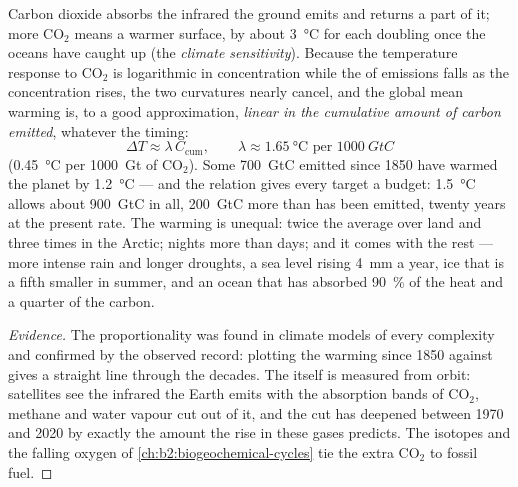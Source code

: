 \begin{proposition}\label{prop:b2:global-change:tcre}
Carbon dioxide absorbs the infrared the ground emits and returns a
part of it; more \ensuremath{\mathrm{CO_2}} means a warmer surface, by about
\qty{3}{\celsius} for each doubling once the oceans have caught up
(the \emph{climate sensitivity}). Because the temperature response
to \ensuremath{\mathrm{CO_2}} is logarithmic in concentration while the  of emissions falls as the concentration rises, the two
curvatures nearly cancel, and the global mean warming is, to a
good approximation, \emph{linear in the cumulative amount of
carbon emitted}, whatever the timing:
\[
\Delta T \approx \lambda\,C_{\text{cum}}, \qquad \lambda \approx
\qty{1.65}{\celsius} \text{ per } \qty{1000}{GtC}
\]
(\qty{0.45}{\celsius} per \qty{1000}{Gt} of \ensuremath{\mathrm{CO_2}}). Some
\qty{700}{GtC} emitted since 1850 have warmed the planet by
\qty{1.2}{\celsius} --- and the relation gives every target a
budget: \qty{1.5}{\celsius} allows about \qty{900}{GtC} in all,
\qty{200}{GtC} more than has been emitted, twenty years at the
present rate. The warming is unequal: twice the average over land
and three times in the Arctic; nights more than days; and it comes
with the rest --- more intense rain and longer droughts, a sea
level rising \qty{4}{mm} a year, ice that is a fifth smaller in
summer, and an ocean that has absorbed \qty{90}{\%} of the heat and
a quarter of the carbon.
\end{proposition}
\begin{proof}[Evidence]
The proportionality was found in climate models of every
complexity and confirmed by the observed record: plotting the
warming since 1850 against  gives a straight
line through the decades. The  itself is measured
from orbit: satellites see the infrared the Earth emits with the
absorption bands of \ensuremath{\mathrm{CO_2}}, methane and water vapour cut out of
it, and the cut has deepened between 1970 and 2020 by exactly the
amount the rise in these gases predicts. The isotopes and the
falling oxygen of \cref{ch:b2:biogeochemical-cycles} tie the extra
\ensuremath{\mathrm{CO_2}} to fossil fuel.
\end{proof}

